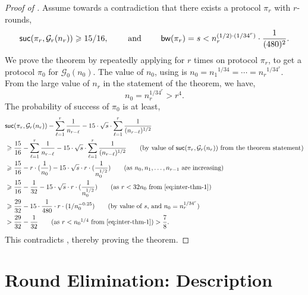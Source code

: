 \documentclass[11pt]{article}
\theoremstyle{definition}
\renewcommand{\geq}{\geqslant}
\newcommand{\prot}{\ensuremath{\pi}}
\newcommand{\suc}{\ensuremath{\textnormal{\textsf{suc}}}}
\newcommand{\bwidth}{\ensuremath{\textnormal{\textsf{bw}}}}
\newcommand{\cG}{\ensuremath{\mathcal{G}}}
\begin{document}
\begin{proof}[Proof of ]
	Assume towards a contradiction that there exists a protocol $\prot_r$ with $r$-rounds, 
	\begin{equation*}
		\suc(\prot_r, \cG_r(n_r)) \geq 15/16, \qquad \textnormal{ and }  \qquad \bwidth(\prot_r) = s < n_r^{(1/2) \cdot (1/34^r)} \cdot \frac1{(480)^2}.
	\end{equation*}
	We prove the theorem by repeatedly applying  for $r$ times on protocol $\prot_r$, to get a protocol $\prot_0$ for $\cG_0(n_0)$. 
	The value of $n_0$, using  is $n_0 = {n_1}^{1/34} = \cdots = {n_r}^{1/34^r}$. 	From the large value of $n_r$ in the statement of the theorem, we have, 
	\begin{equation}\label{eq:inter-thm-1}
		n_0 = n_r^{1/34^r} > r^4. 
	\end{equation}
	The probability of success of $\prot_0$ is at least, 
	\begin{align*}
		&\suc(\prot_r, \cG_r(n_r)) - \sum_{\ell = 1}^r \frac1{n_{r-\ell}} - 15 \cdot \sqrt{s} \cdot  \sum_{\ell = 1}^r \frac1{(n_{r-\ell})^{1/2}} \\
		&\geq \frac{15}{16} - \sum_{\ell = 1}^r \frac1{n_{r-\ell}} - 15 \cdot \sqrt{s} \cdot  \sum_{\ell = 1}^r \frac1{(n_{r-\ell})^{1/2}} \tag{by value of $\suc(\prot_r, \cG_r(n_r))$ from the theorem statement} \\
		&\geq  \frac{15}{16} - r \cdot (\frac1{n_0}) - 15 \cdot \sqrt{s} \cdot  r \cdot (\frac1{n_0^{1/2}}) \tag{as $n_0, n_1, \ldots, n_{r-1}$ are increasing} \\
		&\geq  \frac{15}{16} - \frac{1}{32} - 15 \cdot \sqrt{s} \cdot  r \cdot (\frac1{n_0^{1/2}}) \tag{as $r  < 32 n_0$ from \Cref{eq:inter-thm-1}} \\
		&\geq \frac{29}{32} - 15 \cdot \frac1{480} \cdot r \cdot (1/n_0^{-0.25}) \tag{by value of $s$, and $n_0 = n_r^{1/34^r}$} \\
		&> \frac{29}{32} - \frac1{32} \tag{as $r < {n_0}^{1/4}$ from \Cref{eq:inter-thm-1}} > \frac78.
	\end{align*}
	This contradicts , thereby proving the theorem.
\end{proof}

\clearpage%

\section{Round Elimination: Description}
\label{sec:round-elim-descr}
\end{document}
